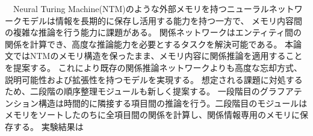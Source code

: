\abstract
　Neural Turing Machine(NTM)のような外部メモリを持つニューラルネットワークモデルは情報を長期的に保存し活用する能力を持つ一方で、
メモリ内容間の複雑な推論を行う能力に課題がある。
関係ネットワークはエンティティ間の関係を計算でき、高度な推論能力を必要とするタスクを解決可能である。
本論文ではNTMのメモリ構造を保ったまま、メモリ内容に関係推論を適用することを提案する。
これにより既存の関係推論ネットワークよりも高度な忘却方式、説明可能性および拡張性を持つモデルを実現する。 想定される課題に対処するため、二段階の順序整理モジュールも新しく提案する。
一段階目のグラフアテンション構造は時間的に隣接する項目間の推論を行う。二段階目のモジュールはメモリをソートしたのちに全項目間の関係を計算し、関係情報専用のメモリに保存する。
実験結果は
